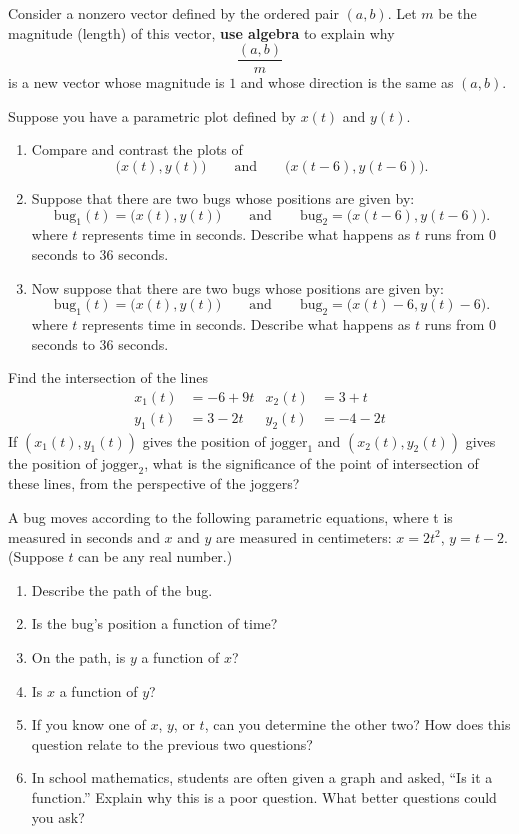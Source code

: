 \begin{prob} 
Consider a nonzero vector defined by the ordered pair $(a,b)$. Let $m$ be the magnitude (length) of this vector, \textbf{use algebra} to explain why
\[
\frac{(a,b)}{m}
\]
is a new vector whose magnitude is $1$ and whose direction is the same
as $(a,b)$.
\end{prob} 

\begin{prob}
Suppose you have a parametric plot defined by $x(t)$ and $y(t)$.
\begin{enumerate}
\item Compare and contrast the plots of
\[
\bigg(x(t),y(t)\bigg)\qquad\text{and}\qquad\bigg(x(t-6),y(t-6)\bigg).
\]
\item Suppose that there are two bugs whose positions are given by:
\[
\mathrm{bug}_1(t) = \bigg(x(t),y(t)\bigg)\qquad\text{and}\qquad\mathrm{bug}_2=\bigg(x(t-6),y(t-6)\bigg).
\]
where $t$ represents time in seconds. Describe what happens as $t$
runs from $0$ seconds to $36$ seconds.

\item Now suppose that there are two bugs whose positions are given
  by:
\[
\mathrm{bug}_1(t) = \bigg(x(t),y(t)\bigg)\qquad\text{and}\qquad\mathrm{bug}_2=\bigg(x(t)-6,y(t)-6\bigg).
\]
where $t$ represents time in seconds. Describe what happens as $t$
runs from $0$ seconds to $36$ seconds.
\end{enumerate}
\end{prob} 

\begin{prob}
Find the intersection of the lines
\begin{align*}
x_1(t) &= -6 + 9t & x_2(t) &= 3+t \\
y_1(t) &= 3-2t &  y_2(t) &= -4-2t 
\end{align*}
If $(x_1(t),y_1(t))$ gives the position of $\mathrm{jogger}_1$ and
$(x_2(t),y_2(t))$ gives the position of $\mathrm{jogger}_2$, what is
the significance of the point of intersection of these lines, from the
perspective of the joggers?
\end{prob}

\begin{prob}
A bug moves according to the following parametric equations, where t is measured in seconds and $x$ and $y$ are measured in centimeters:  $x = 2t^2$, $y = t-2$.  (Suppose $t$ can be any real number.)   
\begin{enumerate}
\item Describe the path of the bug.  
\item Is the bug's position a function of time?  
\item On the path, is $y$ a function of $x$?  
\item Is $x$ a function of $y$?  
\item If you know one of $x$, $y$, or $t$, can you determine the other two?  How does this question relate to the previous two questions?  
\item In school mathematics, students are often given a graph and asked, ``Is it a function.''  Explain why this is a poor question.  What better questions could you ask?  
\end{enumerate}
\end{prob}

